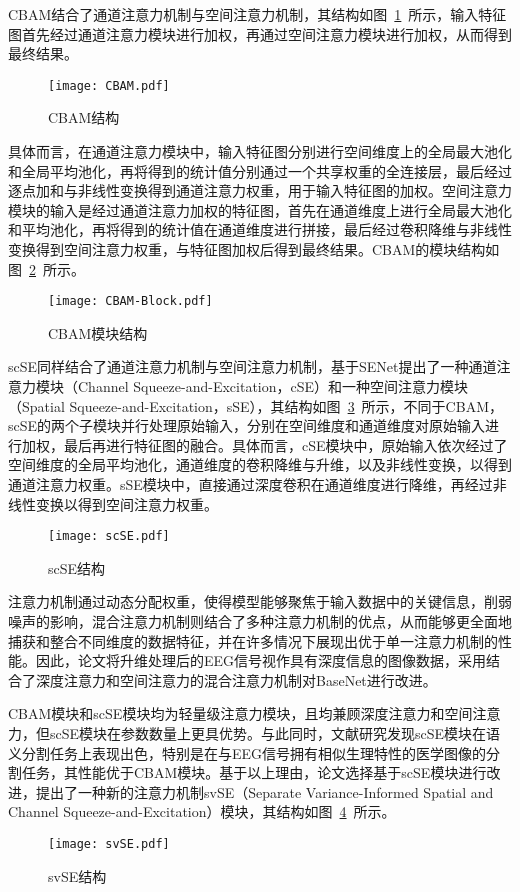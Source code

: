 CBAM结合了通道注意力机制与空间注意力机制，其结构如图~\ref{fig:CBAM}~所示，输入特征图首先经过通道注意力模块进行加权，再通过空间注意力模块进行加权，从而得到最终结果。
\begin{figure}
    \centering
    \texttt{[image: CBAM.pdf]}
    \caption{CBAM结构}
    \label{fig:CBAM}
\end{figure}

具体而言，在通道注意力模块中，输入特征图分别进行空间维度上的全局最大池化和全局平均池化，再将得到的统计值分别通过一个共享权重的全连接层，最后经过逐点加和与非线性变换得到通道注意力权重，用于输入特征图的加权。空间注意力模块的输入是经过通道注意力加权的特征图，首先在通道维度上进行全局最大池化和平均池化，再将得到的统计值在通道维度进行拼接，最后经过卷积降维与非线性变换得到空间注意力权重，与特征图加权后得到最终结果。CBAM的模块结构如图~\ref{fig:CBAM-Block}~所示。
\begin{figure}
  \centering
  \texttt{[image: CBAM-Block.pdf]}
  \caption{CBAM模块结构}
  \label{fig:CBAM-Block}
\end{figure}

scSE同样结合了通道注意力机制与空间注意力机制，基于SENet提出了一种通道注意力模块（Channel Squeeze-and-Excitation，cSE）和一种空间注意力模块（Spatial Squeeze-and-Excitation，sSE），其结构如图~\ref{fig:scSE}~所示，不同于CBAM，scSE的两个子模块并行处理原始输入，分别在空间维度和通道维度对原始输入进行加权，最后再进行特征图的融合。具体而言，cSE模块中，原始输入依次经过了空间维度的全局平均池化，通道维度的卷积降维与升维，以及非线性变换，以得到通道注意力权重。sSE模块中，直接通过深度卷积在通道维度进行降维，再经过非线性变换以得到空间注意力权重。
\begin{figure}
    \centering
    \texttt{[image: scSE.pdf]}
    \caption{scSE结构}
    \label{fig:scSE}
\end{figure}

注意力机制通过动态分配权重，使得模型能够聚焦于输入数据中的关键信息，削弱噪声的影响，混合注意力机制则结合了多种注意力机制的优点，从而能够更全面地捕获和整合不同维度的数据特征，并在许多情况下展现出优于单一注意力机制的性能。因此，论文将升维处理后的EEG信号视作具有深度信息的图像数据，采用结合了深度注意力和空间注意力的混合注意力机制对BaseNet进行改进。

CBAM模块和scSE模块均为轻量级注意力模块，且均兼顾深度注意力和空间注意力，但scSE模块在参数数量上更具优势。与此同时，文献\cite{roy2018concurrent}研究发现scSE模块在语义分割任务上表现出色，特别是在与EEG信号拥有相似生理特性的医学图像的分割任务，其性能优于CBAM模块。基于以上理由，论文选择基于scSE模块进行改进，提出了一种新的注意力机制svSE（Separate Variance-Informed Spatial and Channel Squeeze-and-Excitation）模块，其结构如图~\ref{fig:svSE}~所示。
\begin{figure}
    \centering
    \texttt{[image: svSE.pdf]}
    \caption{svSE结构}
    \label{fig:svSE}
\end{figure}

